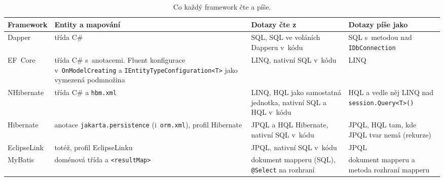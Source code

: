 \begin{table}[H]
\centering\footnotesize
\begin{tabularx}{\textwidth}{L{1.75cm} Y L{5.0cm} L{4.6cm}}
\toprule
\textbf{Framework} & \textbf{Entity a mapování} & \textbf{Dotazy čte z} & \textbf{Dotazy píše jako} \\
\midrule
Dapper & třída C\# & SQL, SQL ve voláních Dapperu v~kódu & SQL s~metodou nad \texttt{IDbConnection} \\
EF~Core & třída C\# s~anotacemi. Fluent konfigurace v~\texttt{OnModelCreating} a \texttt{IEntityTypeConfiguration<T>} jako vymezená podmnožina & LINQ, nativní SQL v~kódu & LINQ \\
NHibernate & třída C\# a \texttt{hbm.xml} & LINQ, HQL jako samostatná jednotka, nativní SQL a HQL v~kódu & HQL a vedle něj LINQ nad \texttt{session.Query<T>()} \\
Hibernate & anotace \texttt{jakarta.persistence} (i~\texttt{orm.xml}), profil Hibernate & JPQL a HQL Hibernate, nativní SQL v~kódu & JPQL, HQL tam, kde JPQL tvar nemá (rekurze) \\
EclipseLink & totéž, profil EclipseLinku & JPQL, nativní SQL v~kódu & JPQL \\
MyBatis & doménová třída a \texttt{<resultMap>} & dokument mapperu (SQL), \texttt{@Select} na rozhraní & dokument mapperu a metoda rozhraní mapperu \\
\bottomrule
\end{tabularx}%
\caption{Co každý framework čte a píše.}
\label{tab:frameworky}
\end{table}

